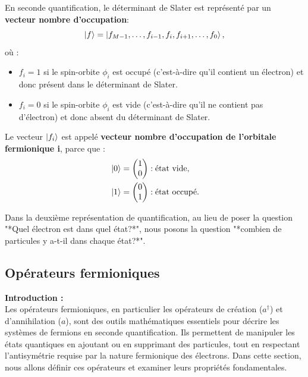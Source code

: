 \documentclass[12pt,a4paper]{article} %
\numberwithin{equation}{section} %
\numberwithin{figure}{section} %
\numberwithin{table}{section} %
\begin{document}
\bigskip

En seconde quantification, le déterminant de Slater est représenté par un \textbf{vecteur nombre d'occupation}:
\begin{equation}
\label{eq:occupation_vector}
\ket{f} = \ket{f_{M-1}, \dots, f_{i-1}, f_i, f_{i+1}, \dots, f_0},
\end{equation}
où :
\begin{itemize}
    \item $f_i = 1$ si le spin-orbite $\phi_i$ est occupé (c'est-à-dire qu'il contient un électron) et donc présent dans le déterminant de Slater.
    \item $f_i = 0$ si le spin-orbite $\phi_i$ est vide (c'est-à-dire qu'il ne contient pas d'électron) et donc absent du déterminant de Slater.
\end{itemize}

Le vecteur $\ket{f_i}$ est appelé \textbf{vecteur nombre d'occupation de l'orbitale fermionique i}, parce que :
\begin{align}
\label{eq:occupation_states}
& \ket{0} = \begin{pmatrix} 1 \\ 0 \end{pmatrix} : \text{état vide}, \\
& \ket{1} = \begin{pmatrix} 0 \\ 1 \end{pmatrix} : \text{état occupé}.
\end{align}

Dans la deuxième représentation de quantification, au lieu de poser la question "*Quel électron est dans quel état?*", nous posons la question "*combien de particules y a-t-il dans chaque état?*".

\subsection{Opérateurs fermioniques}

\noindent \textbf{Introduction :} \\
Les opérateurs fermioniques, en particulier les opérateurs de création ($a^\dagger$) et d'annihilation ($a$), sont des outils mathématiques essentiels pour décrire les systèmes de fermions en seconde quantification. Ils permettent de manipuler les états quantiques en ajoutant ou en supprimant des particules, tout en respectant l'antisymétrie requise par la nature fermionique des électrons. Dans cette section, nous allons définir ces opérateurs et examiner leurs propriétés fondamentales.
\end{document}
